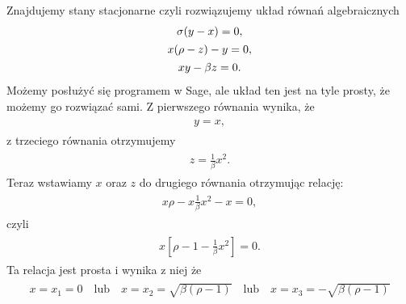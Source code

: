 \documentclass[a4paper,12pt,polish]{sphinxmanual}
\begin{document}
Znajdujemy stany stacjonarne czyli rozwiązujemy układ równań algebraicznych
\label{ch1/chI023:equation-eqn59}\begin{gather}
\begin{split}\sigma (y-x) =0,\end{split}\label{ch1/chI023-eqn59}\\\begin{split}x(\rho - z) -y = 0,\end{split}\notag\\\begin{split}x y - \beta z = 0.\end{split}\notag
\end{gather}
Możemy posłużyć się programem w Sage, ale układ ten jest na tyle prosty, że możemy go rozwiązać  sami. Z pierwszego równania wynika, że
\label{ch1/chI023:equation-eqn60}\begin{gather}
\begin{split}y=x,\end{split}\label{ch1/chI023-eqn60}
\end{gather}
z trzeciego równania otrzymujemy
\label{ch1/chI023:equation-eqn61}\begin{gather}
\begin{split}z= \frac{1}{\beta} x^2.\end{split}\label{ch1/chI023-eqn61}
\end{gather}
Teraz wstawiamy $x$ oraz $z$ do drugiego równania otrzymując relację:
\label{ch1/chI023:equation-eqn62}\begin{gather}
\begin{split}x \rho - x   {\frac{1}{\beta} }x^2 -x=0,\end{split}\label{ch1/chI023-eqn62}
\end{gather}
czyli
\label{ch1/chI023:equation-eqn63}\begin{gather}
\begin{split}x [ \rho - 1  - {\frac{1}{\beta} }x^2]=0.\end{split}\label{ch1/chI023-eqn63}
\end{gather}
Ta relacja jest prosta i wynika z niej że
\label{ch1/chI023:equation-eqn64}\begin{gather}
\begin{split}x= x_1 = 0 \quad \mbox{lub} \quad x=  x_2 = \sqrt{\beta ( \rho -1)} \quad \mbox{lub} \quad x= x_3 =  - \sqrt{\beta ( \rho -1)}\end{split}\label{ch1/chI023-eqn64}
\end{gather}
\end{document}
